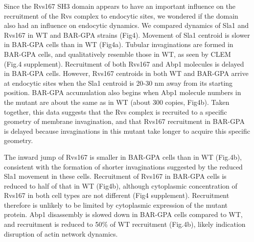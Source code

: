 \documentclass[9pt,lineno]{elife}
\begin{document}
Since the Rvs167 SH3 domain appears to have an important influence on the recruitment of the Rvs complex to endocytic sites, we wondered if the domain also had an influence on endocytic dynamics. We compared dynamics of Sla1 and Rvs167 in WT and BAR-GPA strains (Fig4). Movement of Sla1 centroid is slower in BAR-GPA cells than in WT (Fig4a). Tubular invaginations are formed in BAR-GPA cells, and qualitatively resemble those in WT, as seen by CLEM (Fig.4 supplement). Recruitment of both Rvs167 and Abp1 molecules is delayed in BAR-GPA cells. However, Rvs167 centroids in both WT and BAR-GPA arrive at endocytic sites when the Sla1 centroid is 20-30 nm away from its starting position. BAR-GPA accumulation also begins when Abp1 molecule numbers in the mutant are about the same as in WT (about 300 copies, Fig4b). Taken together, this data suggests that the Rvs complex is recruited to a specific geometry of membrane invagination, and that Rvs167 recruitment in BAR-GPA is delayed because invaginations in this mutant take longer to acquire this specific geometry.

 The inward jump of Rvs167 is smaller in BAR-GPA cells than in WT (Fig.4b), consistent with the formation of shorter invaginations suggested by the reduced Sla1 movement in these cells. Recruitment of Rvs167 in BAR-GPA cells is reduced to half of that in WT (Fig4b), although cytoplasmic concentration of Rvs167 in both cell types are not different (Fig4 supplement). Recruitment therefore is unlikely to be limited by cytoplasmic expression of the mutant protein. Abp1 disassembly is slowed down in BAR-GPA cells compared to WT, and recruitment is reduced to 50\% of WT recruitment (Fig.4b), likely indication disruption of actin network dynamics. 

\end{document}

